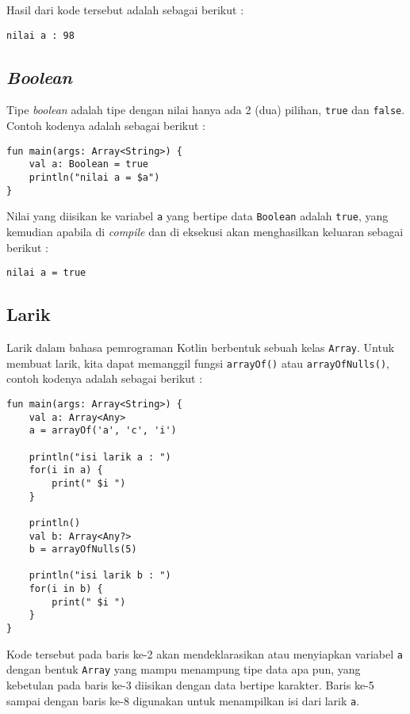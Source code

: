 Hasil dari kode tersebut adalah sebagai berikut :

\begin{lstlisting}
nilai a : 98
\end{lstlisting}

\subsection{\textit{Boolean}}

Tipe \textit{boolean} adalah tipe dengan nilai hanya ada 2 (dua) pilihan, \texttt{true} dan \texttt{false}. Contoh kodenya adalah sebagai berikut :

\begin{lstlisting}
fun main(args: Array<String>) {
	val a: Boolean = true
	println("nilai a = $a")
}
\end{lstlisting}

Nilai yang diisikan ke variabel \texttt{a} yang bertipe data \texttt{Boolean} adalah \texttt{true}, yang kemudian apabila di \textit{compile} dan di eksekusi akan menghasilkan keluaran sebagai berikut :

\begin{lstlisting}
nilai a = true
\end{lstlisting}

\subsection{Larik}

Larik dalam bahasa pemrograman Kotlin berbentuk sebuah kelas \texttt{Array}. Untuk membuat larik, kita dapat memanggil fungsi \texttt{arrayOf()} atau \texttt{arrayOfNulls()}, contoh kodenya adalah sebagai berikut :

\begin{lstlisting}
fun main(args: Array<String>) {
	val a: Array<Any>
	a = arrayOf('a', 'c', 'i')
	
	println("isi larik a : ")
	for(i in a) {
		print(" $i ")
	}
	
	println()
	val b: Array<Any?>
	b = arrayOfNulls(5)
	
	println("isi larik b : ")
	for(i in b) {
		print(" $i ")
	}
}
\end{lstlisting}

Kode tersebut pada baris ke-2 akan mendeklarasikan atau menyiapkan variabel \texttt{a} dengan bentuk \texttt{Array} yang mampu menampung tipe data apa pun, yang kebetulan pada baris ke-3 diisikan dengan data bertipe karakter. Baris ke-5 sampai dengan baris ke-8 digunakan untuk menampilkan isi dari larik \texttt{a}.

